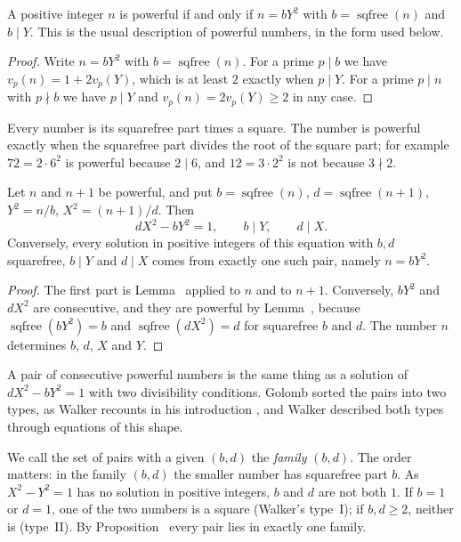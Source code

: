 \begin{lemma}
A positive integer $n$ is powerful if and only if $n = bY^2$ with $b = \operatorname{sqfree}(n)$ and $b \mid Y$. This is the usual
description of powerful numbers, in the form used below.
\end{lemma}

\begin{proof}
Write $n = bY^2$ with $b = \operatorname{sqfree}(n)$. For a prime $p \mid b$ we have $v_p(n) = 1 + 2v_p(Y)$, which is at least $2$ exactly
when $p \mid Y$. For a prime $p \mid n$ with $p \nmid b$ we have $p \mid Y$ and $v_p(n) = 2v_p(Y) \ge 2$ in any case.
\end{proof}

\inwords Every number is its squarefree part times a square. The number is powerful exactly when the squarefree part divides the
root of the square part; for example $72 = 2 \cdot 6^2$ is powerful because $2 \mid 6$, and $12 = 3 \cdot 2^2$ is not because $3 \nmid 2$.

\begin{proposition}
Let $n$ and $n + 1$ be powerful, and put $b = \operatorname{sqfree}(n)$, $d = \operatorname{sqfree}(n + 1)$, $Y^2 = n/b$, $X^2 = (n+1)/d$.
Then
\[
  dX^2 - bY^2 = 1, \qquad b \mid Y, \qquad d \mid X .
\]
Conversely, every solution in positive integers of this equation with $b, d$ squarefree, $b \mid Y$ and $d \mid X$ comes from exactly one
such pair, namely $n = bY^2$.
\end{proposition}

\begin{proof}
The first part is Lemma~ applied to $n$ and to $n + 1$. Conversely, $bY^2$ and $dX^2$ are consecutive, and they are
powerful by Lemma~, because $\operatorname{sqfree}(bY^2) = b$ and $\operatorname{sqfree}(dX^2) = d$ for squarefree
$b$ and $d$. The number $n$ determines $b$, $d$, $X$ and $Y$.
\end{proof}

\inwords A pair of consecutive powerful numbers is the same thing as a solution of $dX^2 - bY^2 = 1$ with two divisibility conditions.
Golomb \cite{Golomb1970} sorted the pairs into two types, as Walker recounts in his introduction \cite[p.~111]{Walker1976}, and Walker described both types through
equations of this shape.

We call the set of pairs with a given $(b, d)$ the \emph{family} $(b, d)$. The order matters: in the family $(b, d)$ the smaller number has
squarefree part $b$. As $X^2 - Y^2 = 1$ has no solution in positive integers, $b$ and $d$ are not both $1$. If $b = 1$ or $d = 1$, one of
the two numbers is a square (Walker's type~I); if $b, d \ge 2$, neither is (type~II). By Proposition~ every pair lies in
exactly one family.

